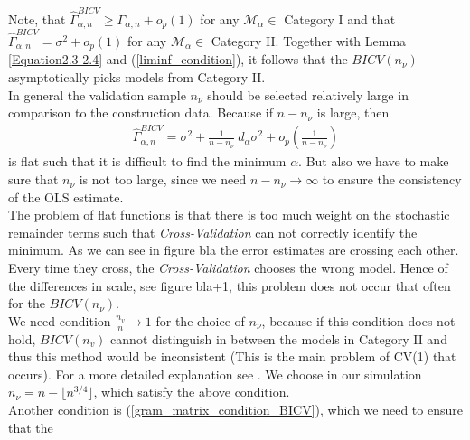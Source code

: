 \documentclass[Research_Module_ES.tex]{subfiles}
\begin{document}
Note, that $\hat{\Gamma}_{\alpha,n}^{BICV}\geq\Gamma_{\alpha,n}+o_p(1)$ for any $\mathcal{M}_\alpha\in$ Category I and that $\hat{\Gamma}_{\alpha,n}^{BICV}=\sigma^2+o_p(1)$ for any $\mathcal{M}_\alpha\in$ Category II. Together with Lemma \ref{Equation2.3-2.4} and (\ref{liminf_condition}), it follows that the $BICV(n_\nu)$ asymptotically picks models from Category II.\\

In general the validation sample $n_\nu$ should be selected relatively large in comparison to the construction data. Because if $n-n_\nu$ is large, then 
\begin{align*}
\hat{\Gamma}^{BICV}_{\alpha,n}=\sigma^2+\frac{1}{n-n_\nu}~d_\alpha\sigma^2+o_p\left(\frac{1}{n-n_\nu}\right)
\end{align*}
is flat such that it is difficult to find the minimum $\alpha$. But also we have to make sure that $n_\nu$ is not too large, since we need $n-n_\nu\to\infty$ to ensure the consistency of the OLS estimate.\\

The problem of flat functions is that  there is too much weight on the stochastic remainder terms such that \textit{Cross-Validation} can not correctly identify the minimum. As we can see in figure bla the error estimates are crossing each other. Every time they cross, the \textit{Cross-Validation} chooses the wrong model. Hence of the differences in scale, see figure bla+1, this problem does not occur that often for the $BICV(n_\nu)$.\\

We need condition $\frac{n_v}{n}\to 1$ for the choice of $n_\nu$, because if this condition does not hold, $BICV(n_v)$ cannot distinguish in between the models in Category II and thus this method would be inconsistent (This is the main problem of CV(1) that occurs). For a more detailed explanation see \cite{shao}. We choose in our simulation $n_\nu=n-\lfloor n^{3/4}\rfloor$, which satisfy the above condition.\\

Another condition is (\ref{gram_matrix_condition_BICV}), which we need to ensure that the 
\end{document}
